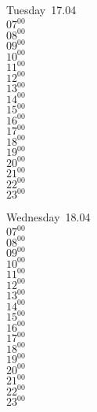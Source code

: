 \documentclass[11pt, a4paper]{book}\usepackage[]{graphicx}\usepackage[]{color}
\begin{document}
\begin{weekdaybox}
  Tuesday~17.04\\
  { 
  \vfill
  $07^{00}$\\
$08^{00}$\\
$09^{00}$\\
$10^{00}$\\
$11^{00}$\\
$12^{00}$\\
$13^{00}$\\
$14^{00}$\\
$15^{00}$\\
$16^{00}$\\
$17^{00}$\\
$18^{00}$\\
$19^{00}$\\
$20^{00}$\\
$21^{00}$\\
$22^{00}$\\
$23^{00}$\\
  }
\end{weekdaybox}
\begin{weekdaybox}
  Wednesday~18.04\\
  { 
  \vfill
  $07^{00}$\\
$08^{00}$\\
$09^{00}$\\
$10^{00}$\\
$11^{00}$\\
$12^{00}$\\
$13^{00}$\\
$14^{00}$\\
$15^{00}$\\
$16^{00}$\\
$17^{00}$\\
$18^{00}$\\
$19^{00}$\\
$20^{00}$\\
$21^{00}$\\
$22^{00}$\\
$23^{00}$\\
  }
\end{weekdaybox}
\clearpage
\begin{headerbox}
\end{headerbox}
\end{document}
